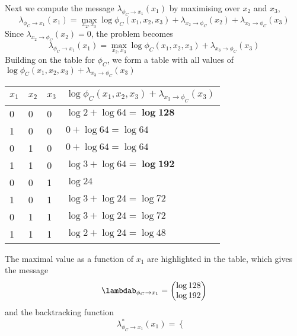 \begin{exenumerate}
\begin{solution}
    Next we compute the message $\lambda_{\phi_C \to x_1}(x_1)$ by maximising over $x_2$ and $x_3$,
    \begin{equation}
      \lambda_{\phi_C \to x_1}(x_1)  = \max_{x_2, x_3} \log \phi_C(x_1, x_2, x_3) +  \lambda_{x_2 \to \phi_C}(x_2) + \lambda_{x_3 \to \phi_C}(x_3)
    \end{equation}
    Since $\lambda_{x_2 \to \phi_C}(x_2) = 0$, the problem becomes
    \begin{equation}
      \lambda_{\phi_C \to x_1}(x_1)  = \max_{x_2, x_3} \log \phi_C(x_1, x_2, x_3) + \lambda_{x_3 \to \phi_C}(x_3)
    \end{equation}
    Building on the table for $\phi_C$, we form a table with all
    values of $\log \phi_C(x_1, x_2, x_3) + \lambda_{x_3 \to
      \phi_C}(x_3)$
    \begin{center}
      \begin{tabular}{llll}
        \toprule
        $x_1$ & $x_2$ & $x_3$ & $\log \phi_C(x_1, x_2, x_3) + \lambda_{x_3 \to \phi_C}(x_3)$\\
        \midrule
        0 & 0 & 0 & $\log 2 + \log 64 = \boldsymbol{\log 128}$ \\
        1 & 0 & 0 & $0 + \log 64 = \log 64$ \\
        0 & 1 & 0 & $0 + \log 64 = \log 64$ \\
        1 & 1 & 0 & $\log 3 + \log 64 = \boldsymbol{\log 192}$ \\
        0 & 0 & 1 & $\log 24$ \\
        1 & 0 & 1 & $\log 3 + \log 24 = \log 72$ \\
        0 & 1 & 1 & $\log 3 + \log 24 = \log 72 $ \\
        1 & 1 & 1 & $\log 2 + \log 24 = \log 48$ \\
        \bottomrule
      \end{tabular}
    \end{center}
    The maximal value as a function of $x_1$ are highlighted in the table, which gives the message
    \begin{equation}
      \lambdab_{\phi_C \to x_1} = \begin{pmatrix}
        \log 128\\
        \log 192
      \end{pmatrix}
    \end{equation}
    and the backtracking function
    \begin{equation}
      \lambda^*_{\phi_C \to x_1}(x_1) = \begin{cases}

\end{cases}
\end{equation}
\end{solution}
\end{exenumerate}
